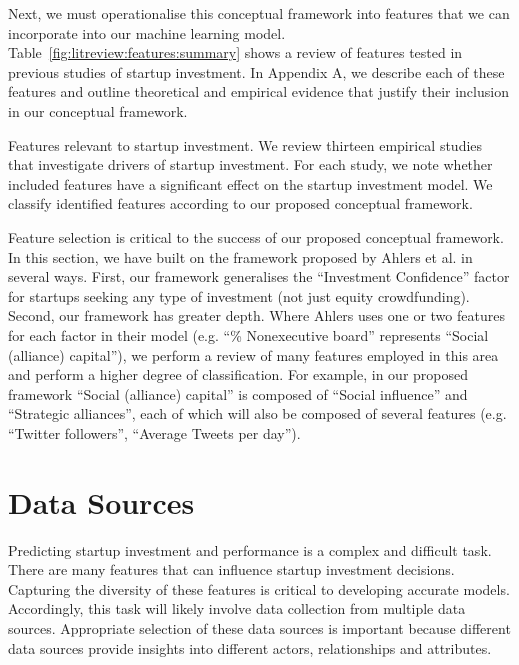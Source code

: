 \documentclass[../thesis/thesis.tex]{subfiles}
\begin{document}
Next, we must operationalise this conceptual framework into features that we can incorporate into our machine learning model. Table~\ref{fig:litreview:features:summary} shows a review of features tested in previous studies of startup investment. In Appendix A, we describe each of these features and outline theoretical and empirical evidence that justify their inclusion in our conceptual framework.

\begin{table}[!htb]
    \centering
    \scalebox{1}{
        
    }
    \caption{Features relevant to startup investment. We review thirteen empirical studies that investigate drivers of startup investment. For each study, we note whether included features have a significant effect on the startup investment model. We classify identified features according to our proposed conceptual framework.}
    \label{fig:litreview:features:summary}
\end{table}

Feature selection is critical to the success of our proposed conceptual framework. In this section, we have built on the framework proposed by Ahlers et al. \cite{ahlers2015} in several ways. First, our framework generalises the ``Investment Confidence'' factor for startups seeking any type of investment (not just equity crowdfunding). Second, our framework has greater depth. Where Ahlers uses one or two features for each factor in their model (e.g. ``\% Nonexecutive board'' represents ``Social (alliance) capital''), we perform a review of many features employed in this area and perform a higher degree of classification. For example, in our proposed framework ``Social (alliance) capital'' is composed of ``Social influence'' and ``Strategic alliances'', each of which will also be composed of several features (e.g. ``Twitter followers'', ``Average Tweets per day'').

\section{Data Sources}

Predicting startup investment and performance is a complex and difficult task. There are many features that can influence startup investment decisions. Capturing the diversity of these features is critical to developing accurate models. Accordingly, this task will likely involve data collection from multiple data sources. Appropriate selection of these data sources is important because different data sources provide insights into different actors, relationships and attributes.
\end{document}
